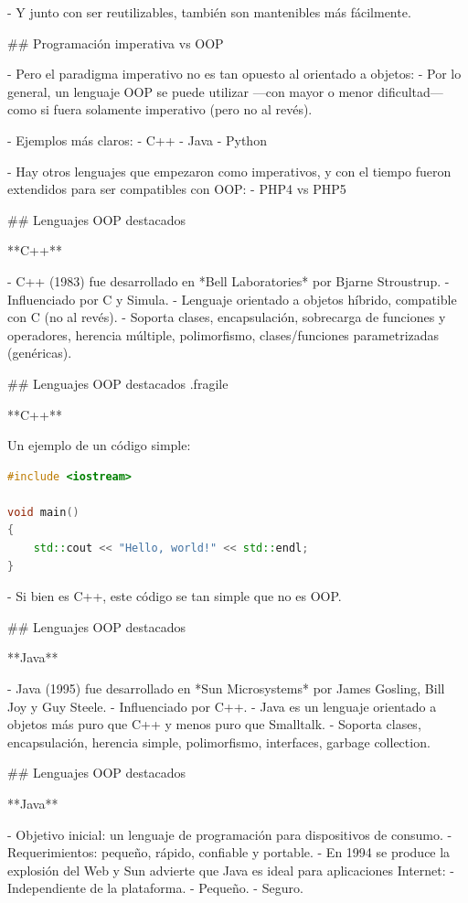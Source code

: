 - Y junto con ser reutilizables, también son mantenibles más fácilmente.

## Programación imperativa vs OOP

- Pero el paradigma imperativo no es tan opuesto al orientado a objetos:
    - Por lo general, un lenguaje OOP se puede utilizar ---con mayor o menor dificultad--- como
    si fuera solamente imperativo (pero no al revés).

- Ejemplos más claros:
    - C++
    - Java
    - Python

- Hay otros lenguajes que empezaron como imperativos, y con el tiempo fueron extendidos
para ser compatibles con OOP:
    - PHP4 vs PHP5

## Lenguajes OOP destacados

**C++**

- C++ (1983) fue desarrollado en *Bell Laboratories* por Bjarne Stroustrup.
- Influenciado por C y Simula.
- Lenguaje orientado a objetos híbrido, compatible con C (no al revés).
- Soporta clases, encapsulación, sobrecarga de funciones y operadores, herencia múltiple, polimorfismo, clases/funciones parametrizadas (genéricas).


## Lenguajes OOP destacados {.fragile}

**C++**\vfill

Un ejemplo de un código simple:
\begin{lstlisting}[language=C++]
#include <iostream>

void main()
{
    std::cout << "Hello, world!" << std::endl;
}
\end{lstlisting}

- Si bien es C++, este código se tan simple que no es OOP.

## Lenguajes OOP destacados

**Java**

- Java (1995) fue desarrollado en *Sun Microsystems* por James Gosling, Bill Joy y Guy Steele.
- Influenciado por C++.
- Java es un lenguaje orientado a objetos más puro que C++ y menos puro que Smalltalk.
- Soporta clases, encapsulación, herencia simple, polimorfismo, interfaces, garbage collection.

## Lenguajes OOP destacados

**Java**

- Objetivo inicial: un lenguaje de programación para dispositivos de consumo.
- Requerimientos: pequeño, rápido, confiable y portable.
- En 1994 se produce la explosión del Web y Sun advierte que Java es ideal para aplicaciones Internet:
    - Independiente de la plataforma.
    - Pequeño.
    - Seguro.

